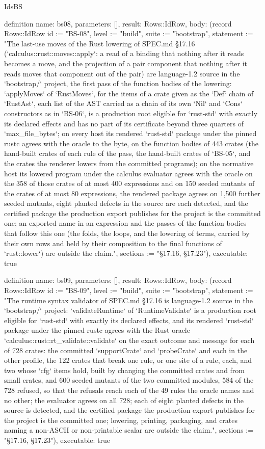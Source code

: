 \begin{lexlean}{IdsBS}
\begin{semanticmodule}
definition{
  name: bs08,
  parameters: [],
  result: Rows::IdRow,
  body: (record Rows::IdRow {id := "BS-08", level := "build", suite := "bootstrap", statement := "The last-use moves of the Rust lowering of SPEC.md §17.16 (`calculus::rust::moves::apply`: a read of a binding that nothing after it reads becomes a move, and the projection of a pair component that nothing after it reads moves that component out of the pair) are language-1.2 source in the `bootstrap/` project, the first pass of the function bodies of the lowering: `applyMoves` of `RustMoves`, for the items of a crate given as the `Def` chain of `RustAst`, each list of the AST carried as a chain of its own `Nil` and `Cons` constructors as in `BS-06`, is a production root eligible for `rust-std` with exactly its declared effects and has no part of its certificate beyond three quarters of `max_file_bytes`; on every host its rendered `rust-std` package under the pinned rustc agrees with the oracle to the byte, on the function bodies of 443 crates (the hand-built crates of each rule of the pass, the hand-built crates of `BS-05`, and the crates the renderer lowers from the committed programs); on the normative host its lowered program under the calculus evaluator agrees with the oracle on the 358 of those crates of at most 400 expressions and on 150 seeded mutants of the crates of at most 80 expressions, the rendered package agrees on 1,500 further seeded mutants, eight planted defects in the source are each detected, and the certified package the production export publishes for the project is the committed one; an exported name in an expression and the passes of the function bodies that follow this one (the folds, the loops, and the lowering of terms, carried by their own rows and held by their composition to the final functions of `rust::lower`) are outside the claim.", sections := "§17.16, §17.23"}),
  executable: true
}

definition{
  name: bs09,
  parameters: [],
  result: Rows::IdRow,
  body: (record Rows::IdRow {id := "BS-09", level := "build", suite := "bootstrap", statement := "The runtime syntax validator of SPEC.md §17.16 is language-1.2 source in the `bootstrap/` project: `validateRuntime` of `RuntimeValidate` is a production root eligible for `rust-std` with exactly its declared effects, and its rendered `rust-std` package under the pinned rustc agrees with the Rust oracle `calculus::rust::rt_validate::validate` on the exact outcome and message for each of 728 crates: the committed `supportCrate` and `probeCrate` and each in the other profile, the 122 crates that break one rule, or one site of a rule, each, and two whose `cfg` items hold, built by changing the committed crates and from small crates, and 600 seeded mutants of the two committed modules, 584 of the 728 refused, so that the refusals reach each of the 49 rules the oracle names and no other; the evaluator agrees on all 728; each of eight planted defects in the source is detected, and the certified package the production export publishes for the project is the committed one; lowering, printing, packaging, and crates naming a non-ASCII or non-printable scalar are outside the claim.", sections := "§17.16, §17.23"}),
  executable: true
}


\end{semanticmodule}
\end{lexlean}
